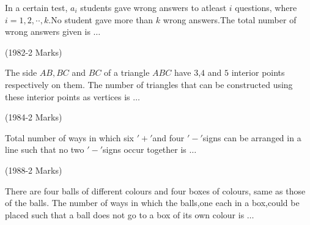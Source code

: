 \iffalse
 \title{ASSIGNMENT-1}
 \author{EE24BTECH11008- ASLIN GARVASIS}
 \section{fitb}
\fi
	\item In a certain test, $a_i$ students gave wrong answers to atleast 
 	$i$ questions, where $i=1,2,\cdot \cdot ,k.$No student gave more than 
 	$k$ wrong answers.The total number of wrong answers given is $\dots$ 
 
		\hfill {(1982-2 Marks)} 

	\item The side $AB,BC$ and $BC$ of a triangle $ABC$ have $3$,$4$ and $5$ 	 interior points respectively on them. The number of triangles
 	that can be constructed using these interior points as
 	vertices is $\dots$ 
 
		\hfill {(1984-2 Marks)} 

	\item Total number of ways in which six $'+'$and four $'-'$signs can
	 be arranged in a line such that no two $'-'$signs occur together
	 is $\dots$
 
		\hfill  {(1988-2 Marks)} 

	\item There are four balls of different colours and four boxes of
 	colours, same as those of the balls. The number of ways in
 	which the balls,one each in a box,could be placed such that
	 a ball does not go to a box of its own colour is $\dots$ 


